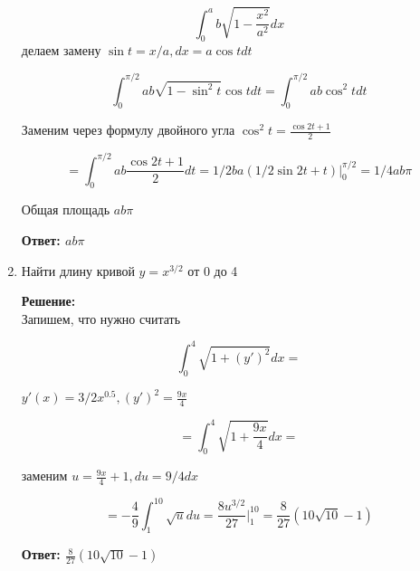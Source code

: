 \documentclass[a4paper,12pt]{article}
\begin{document}
\begin{enumerate}
$$\int^{a}_0 b \sqrt{1-\frac{x^2}{a^2}} dx
$$
делаем замену $\sin t = x/a, dx = a \cos t dt$

$$\int^{\pi/2}_0 a b \sqrt{1-\sin^2t} \cos t dt =\int^{\pi/2}_0 a b \cos^2 t dt 
$$

Заменим через формулу двойного угла $\cos^2t = \frac{\cos2t +1 }{2}$

$$=\int^{\pi/2}_0 a b\frac{\cos2t +1 }{2} dt = 1/2 b a (1/2 \sin 2t + t)\Biggr|_{0}^{\pi/2} = 1/4 a b \pi$$

Общая площадь $a b \pi$

\textbf{Ответ: $a b \pi$}
\item Найти длину кривой $y = x^{3/2}$ от 0 до 4

\textbf{Решение:}\\
Запишем, что нужно считать

$$\int^{4}_0  \sqrt{1+(y')^2} dx=
$$


$y'(x) = 3/2 x^{0.5}, (y')^2 = \frac{9x}{4}$

$$=\int^{4}_0  \sqrt{1+\frac{9x}{4}} dx=
$$

заменим $u = \frac{9x}{4}+1, du = 9/4dx$


$$=-\frac{4}{9}\int^{10}_1 \sqrt{u}du= \frac{8u^{3/2}}{27}\Biggr|_{1}^{10} = \frac{8}{27} (10\sqrt{10}-1)$$


\textbf{Ответ: $ \frac{8}{27} (10\sqrt{10}-1)$}

\end{enumerate}
\end{document}
